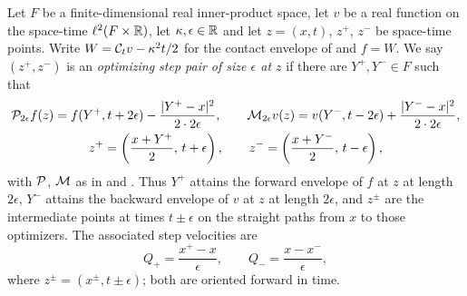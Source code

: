 \begin{definition}
Let $F$ be a finite-dimensional real inner-product space, let $v$ be a real
function on the space-time $\ell^2(F\times\mathbb{R})$, let $\kappa,\epsilon\in\mathbb{R}$ and
let $z=(x,t)$, $z^+$, $z^-$ be space-time points. Write
$W=\mathcal{C}_tv-\kappa^2t/2$ for the contact envelope of  and
$f=W$. We say $(z^+,z^-)$ is an \emph{optimizing step pair of size $\epsilon$ at
$z$} if there are $Y^+,Y^-\in F$ such that
\begin{gather*}
  \mathcal{P}_{2\epsilon}f(z)
    =f(Y^+,t+2\epsilon)-\frac{|Y^+-x|^2}{2\cdot2\epsilon},
  \qquad
  \mathcal{M}_{2\epsilon}v(z)
    =v(Y^-,t-2\epsilon)+\frac{|Y^--x|^2}{2\cdot2\epsilon},
  \\
  z^+=\left(\frac{x+Y^+}{2},\,t+\epsilon\right),
  \qquad
  z^-=\left(\frac{x+Y^-}{2},\,t-\epsilon\right),
\end{gather*}
with $\mathcal{P}$, $\mathcal{M}$ as in  and . Thus
$Y^+$ attains the forward envelope of $f$ at $z$ at length $2\epsilon$, $Y^-$
attains the backward envelope of $v$ at $z$ at length $2\epsilon$, and
$z^\pm$ are the intermediate points at times $t\pm\epsilon$ on the straight
paths from $x$ to those optimizers. The associated step velocities are
\[
  Q_+=\frac{x^+-x}{\epsilon},\qquad
  Q_-=\frac{x-x^-}{\epsilon},
\]
where $z^\pm=(x^\pm,t\pm\epsilon)$; both are oriented forward in time.
\end{definition}
